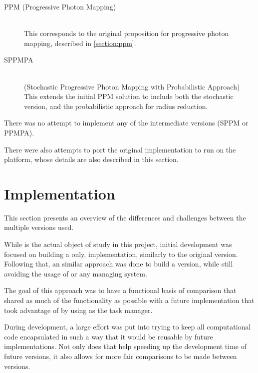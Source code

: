 \documentclass[main.tex]{subfiles}
\begin{document}
\begin{description}
\item[PPM (Progressive Photon Mapping)] \hfill \\
  This corresponds to the original proposition for progressive photon mapping, described in \cref{section:ppm}.

\item[SPPMPA] \hfill \\
  (Stochastic Progressive Photon Mapping with Probabilistic Approach) This extends the initial PPM solution to include both the stochastic version, and the probabilistic approach for radius reduction.
\end{description}

There was no attempt to implement any of the intermediate versions (SPPM or PPMPA).

There were also attempts to port the original implementation to run on the \mic platform, whose details are also described in this section.




\section{Implementation}

This section presents an overview of the differences and challenges between the multiple versions used.

While \starpu is the actual object of study in this project, initial development was focused on building a \cpu only, implementation, similarly to the original version. Following that, an similar approach was done to build a \cuda version, while still avoiding the usage of \starpu or any \hetplat managing system.

The goal of this approach was to have a functional basis of comparison that shared as much of the functionality as possible with a future implementation that took advantage of \hetplats by using \starpu as the task manager.

During development, a large effort was put into trying to keep all computational code encapsulated in such a way that it would be reusable by future implementations. Not only does that help speeding up the development time of future versions, it also allows for more fair comparisons to be made between versions.






\end{document}
